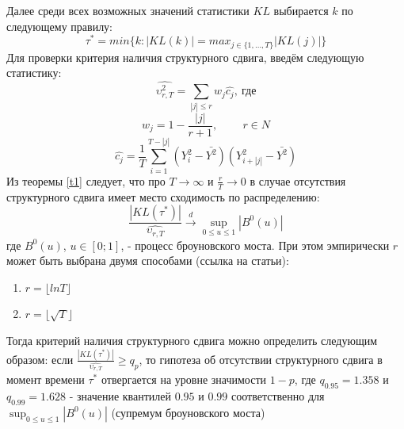 \documentclass[a4paper,14pt,russian]{extarticle}
\begin{document}
	Далее среди всех возможных значений статистики $KL$ выбирается $k$ по следующему правилу:
	\begin{equation}
		\tau^{*} = min\{k: |KL(k)| = max_{j \in \{1, \dots, T\}}|KL(j)| \}
	\end{equation}
	Для проверки критерия наличия структурного сдвига, введём следующую статистику:
	\begin{equation}
		\hat{\upsilon_{r,T}^2} = \sum_{|j| \leq r}^{}w_j\hat{c_j}, \ \text{где}
	\end{equation}
	\begin{equation}
		w_j = 1 - \frac{|j|}{r + 1}, \qquad \ r \in N
	\end{equation}
	\begin{equation}
		\hat{c_j} = \frac{1}{T} \sum_{i=1}^{T - |j|} (Y_i^2 - \bar{Y^2})(Y_{i + |j|}^2 - \bar{Y^2})
	\end{equation}
	Из теоремы \ref{t1} следует, что про $T \to \infty$ и $\frac{r}{T} \to 0$ в случае отсутствия структурного сдвига имеет место сходимость по распределению:
	\begin{equation}
		\frac{|KL(\tau^*)|}{\hat{\upsilon_{r,T}}} \xrightarrow[]{d} \sup_{0 \leq u \leq 1}|B^0(u)|
	\end{equation}
	где $B^0(u)$, $u \in \left[0; 1\right]$, - процесс броуновского моста. При этом эмпирически $r$ может быть выбрана двумя способами (ссылка на статьи):
	\begin{enumerate}
		\item $r = \lfloor lnT \rfloor$
		\item $r = \lfloor \sqrt{T} \rfloor$
	\end{enumerate}
	Тогда критерий наличия структурного сдвига можно определить следующим образом: если $\frac{|KL(\tau^*)|}{\hat{\upsilon_{r,T}}} \geq q_p$, то гипотеза об отсутствии структурного сдвига в момент времени $\tau^*$ отвергается на уровне значимости $1 - p$, где $q_{0.95} = 1.358$ и $q_{0.99} = 1.628$ - значение квантилей $0.95$ и $0.99$ соответственно для $\sup_{0 \leq u \leq 1}|B^0(u)|$ (супремум броуновского моста)
	
	
	\clearpage
\end{document}
